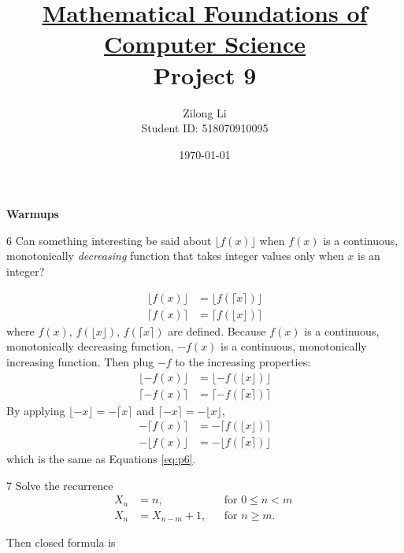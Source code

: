 \documentclass[a4paper,12pt]{article}
\title{\small \underline{Mathematical Foundations of Computer Science}\\\Large Project 9}
\author{Zilong Li\\\small Student ID: 518070910095}
\date{\today}
\makeatletter
\newtheorem*{solution}{Solution}
\theoremstyle{definition}
\renewenvironment{solution}[1][Solution] {\par\pushQED{\qed}\normalfont\topsep6\p@\@plus6\p@\relax\trivlist\item[\hskip\labelsep\bfseries#1\@addpunct{.}]\ignorespaces}{\popQED\endtrivlist\@endpefalse} \makeatother
\newenvironment{problems}{\begin{list}{}{\renewcommand{\makelabel}[1]{\textbf{##1}\hfil}}}{\end{list}}
\makeatother
\begin{document}
\maketitle

\noindent\textbf{Warmups}

\begin{problems}
    \item[6] Can something interesting be said about $\lfloor f(x)\rfloor$ when $f(x)$ is a continuous, monotonically \emph{decreasing} function that takes integer values only when $x$ is an integer?
    \begin{solution}
        \begin{equation}\label{eq:p6}
            \begin{aligned}
            \lfloor f(x)\rfloor &=\lfloor f(\lceil x\rceil)\rfloor\\
            \lceil f(x) \rceil &= \lceil f(\lfloor x \rfloor)\rceil
            \end{aligned}
        \end{equation}
        where $f(x)$, $f(\lfloor x\rfloor)$, $f(\lceil x\rceil)$ are defined. Because $f(x)$ is a continuous, monotonically decreasing function, $-f(x)$ is a continuous, monotonically increasing function. Then plug $-f$ to the increasing properties:
        \begin{align*}
            \lfloor -f(x) \rfloor &= \lfloor -f(\lfloor x\rfloor)\rfloor\\
            \lceil -f(x) \rceil &=\lceil -f(\lceil x\rceil)\rceil
        \end{align*}
        By applying $\lfloor -x \rfloor=-\lceil x\rceil$ and $\lceil -x \rceil=-\lfloor x\rfloor$,
        \begin{align*}
            -\lceil f(x) \rceil &= -\lceil f(\lfloor x\rfloor)\rceil\\
            -\lfloor f(x) \rfloor &=-\lfloor f(\lceil x\rceil)\rfloor
        \end{align*}
        which is the same as Equations \eqref{eq:p6}.
    \end{solution} 
    \item[7] Solve the recurrence
    \begin{align*}
        X_n&=n,&&\text{for }0\leq n<m\;\\
        X_n&=X_{n-m}+1,&&\text{for }n\geq m.
    \end{align*} 
    \begin{solution}
        Then closed formula is
        \begin{equation}\label{eq:p7}

\end{equation}
\end{solution}
\end{problems}
\end{document}
